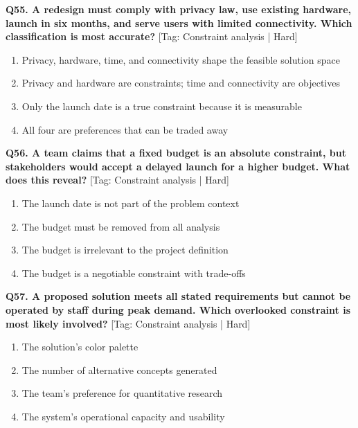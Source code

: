 \noindent\textbf{Q55. A redesign must comply with privacy law, use existing hardware, launch in six months, and serve users with limited connectivity. Which classification is most accurate?} \hfill [Tag: Constraint analysis | Hard]
\begin{enumerate}[label=(\alph*),topsep=2pt,itemsep=1pt,partopsep=0pt,parsep=0pt]
    \item {Privacy, hardware, time, and connectivity shape the feasible solution space}
    \item {Privacy and hardware are constraints; time and connectivity are objectives}
    \item {Only the launch date is a true constraint because it is measurable}
    \item {All four are preferences that can be traded away}
\end{enumerate}
\vspace{2mm}

\noindent\textbf{Q56. A team claims that a fixed budget is an absolute constraint, but stakeholders would accept a delayed launch for a higher budget. What does this reveal?} \hfill [Tag: Constraint analysis | Hard]
\begin{enumerate}[label=(\alph*),topsep=2pt,itemsep=1pt,partopsep=0pt,parsep=0pt]
    \item {The launch date is not part of the problem context}
    \item {The budget must be removed from all analysis}
    \item {The budget is irrelevant to the project definition}
    \item {The budget is a negotiable constraint with trade-offs}
\end{enumerate}
\vspace{2mm}

\noindent\textbf{Q57. A proposed solution meets all stated requirements but cannot be operated by staff during peak demand. Which overlooked constraint is most likely involved?} \hfill [Tag: Constraint analysis | Hard]
\begin{enumerate}[label=(\alph*),topsep=2pt,itemsep=1pt,partopsep=0pt,parsep=0pt]
    \item {The solution's color palette}
    \item {The number of alternative concepts generated}
    \item {The team's preference for quantitative research}
    \item {The system's operational capacity and usability}
\end{enumerate}
\vspace{2mm}

